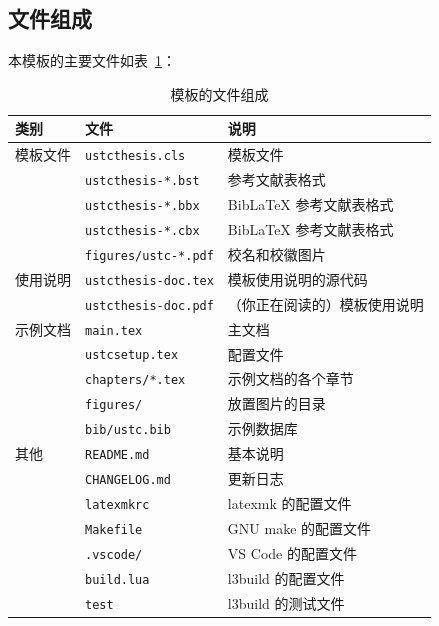 \documentclass[a4paper]{ltxdoc}
\DeclareRobustCommand\file{\nolinkurl}
\begin{document}
\subsection{文件组成}
本模板的主要文件如表~\ref{tab:files}：
\begin{table}
  \centering\small
  \caption{模板的文件组成}
  \label{tab:files}
  \begin{tabular}{lll}
    \toprule
    类别     & 文件                      & 说明                         \\
    \midrule
    模板文件 & \file{ustcthesis.cls}     & 模板文件                     \\
             & \file{ustcthesis-*.bst}   & \BibTeX{} 参考文献表格式     \\
             & \file{ustcthesis-*.bbx}   & BibLaTeX 参考文献表格式      \\
             & \file{ustcthesis-*.cbx}   & BibLaTeX 参考文献表格式      \\
             & \file{figures/ustc-*.pdf} & 校名和校徽图片               \\
    \midrule
    使用说明 & \file{ustcthesis-doc.tex} & 模板使用说明的源代码         \\
             & \file{ustcthesis-doc.pdf} & （你正在阅读的）模板使用说明 \\
    \midrule
    示例文档 & \file{main.tex}           & 主文档                       \\
             & \file{ustcsetup.tex}      & 配置文件                     \\
             & \file{chapters/*.tex}     & 示例文档的各个章节           \\
             & \file{figures/}           & 放置图片的目录               \\
             & \file{bib/ustc.bib}       & \BibTeX{} 示例数据库         \\
    \midrule
    其他     & \file{README.md}          & 基本说明                     \\
             & \file{CHANGELOG.md}       & 更新日志                     \\
             & \file{latexmkrc}          & latexmk 的配置文件           \\
             & \file{Makefile}           & GNU make 的配置文件          \\
             & \file{.vscode/}           & VS Code 的配置文件           \\
             & \file{build.lua}          & l3build 的配置文件           \\
             & \file{test}               & l3build 的测试文件           \\
    \bottomrule
  \end{tabular}
\end{table}
\end{document}
